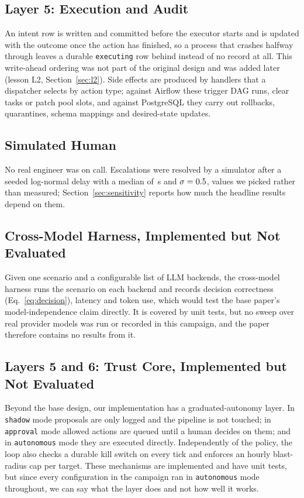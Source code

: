 \subsection{Layer 5: Execution and Audit}
An intent row is written and committed before the executor starts and is updated with the outcome
once the action has finished, so a process that crashes halfway through leaves a durable
\texttt{executing} row behind instead of no record at all. This write-ahead ordering was not part
of the original design and was added later (lesson L2, Section~\ref{sec:l2}). Side effects are
produced by handlers that a dispatcher selects by action type; against Airflow these trigger DAG
runs, clear tasks or patch pool slots, and against PostgreSQL they carry out rollbacks, quarantines,
schema mappings and desired-state updates.

\subsection{Simulated Human}
No real engineer was on call. Escalations were resolved by a simulator after a seeded log-normal delay
with a median of \NHumanMedian{}\,s and $\sigma=0.5{}$, values we picked rather than
measured; Section~\ref{sec:sensitivity} reports how much the headline results depend on them.

\subsection{Cross-Model Harness, Implemented but Not Evaluated}
Given one scenario and a configurable list of LLM backends, the cross-model harness runs the scenario
on each backend and records decision correctness (Eq.~\eqref{eq:decision}), latency and token use,
which would test the base paper's model-independence claim directly. It is covered by unit tests, but
no sweep over real provider models was run or recorded in this campaign, and the paper therefore
contains no results from it.

\subsection{Layers 5 and 6: Trust Core, Implemented but Not Evaluated}
Beyond the base design, our implementation has a graduated-autonomy layer. In \texttt{shadow} mode
proposals are only logged and the pipeline is not touched; in \texttt{approval} mode allowed actions
are queued until a human decides on them; and in \texttt{autonomous} mode they are executed
directly. Independently of the policy, the loop also checks a durable kill switch on every tick and
enforces an hourly blast-radius cap per target. These mechanisms are implemented and have unit
tests, but since every configuration in the campaign ran in \texttt{autonomous} mode throughout, we
can say what the layer does and not how well it works.

